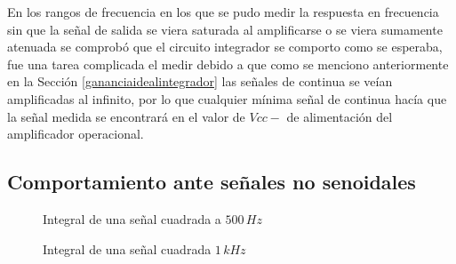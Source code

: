 \documentclass[11pt, a4paper]{article}
\begin{document}
En los rangos de frecuencia en los que se pudo medir la respuesta en frecuencia sin que la señal de salida se viera saturada al amplificarse o se viera sumamente atenuada se comprobó que el circuito integrador se comporto como se esperaba, fue una tarea complicada el medir debido a que como se menciono anteriormente en la Sección \ref{gananciaidealintegrador} las señales de continua se veían amplificadas al infinito, por lo que cualquier mínima señal de continua hacía que la señal medida se encontrará en el valor de $V{cc-}$ de alimentación del amplificador operacional.

\subsection{Comportamiento ante señales no senoidales}

\begin{figure}[H]
	\begin{center}
		\caption{Integral de una señal cuadrada a $500 \, Hz$}
		\label{fig:IntegralNOcomp500Hz}
	\end{center}
\end{figure}

\begin{figure}[H]
	\begin{center}
		\caption{Integral de una señal cuadrada $1 \, kHz$}
		\label{fig:IntegralNOcomp1kHz}
	\end{center}
\end{figure}
\end{document}
